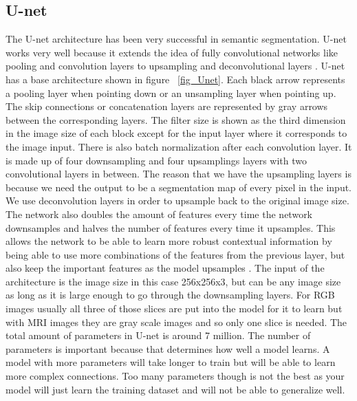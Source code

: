 \subsection{U-net}
%
The U-net architecture has been very successful in semantic segmentation. 
U-net works very well because it extends the idea of fully convolutional networks like pooling and convolution layers to upsampling and deconvolutional layers \cite{DBLP:journals/corr/RonnebergerFB15}.
U-net has a base architecture shown in figure ~\ref{fig_Unet}. 
Each black arrow represents a pooling layer when pointing down or an unsampling layer when pointing up. 
The skip connections or concatenation layers are represented by gray arrows between the corresponding layers. 
The filter size is shown as the third dimension in the image size of each block except for the input layer where it corresponds to the image input. 
There is also batch normalization after each convolution layer.
It is made up of four downsampling and four upsamplings layers with two convolutional layers in between. 
The reason that we have the upsampling layers is because we need the output to be a segmentation map of every pixel in the input.
We use deconvolution layers in order to upsample back to the original image size. 
The network also doubles the amount of features every time the network downsamples and halves the number of features every time it upsamples. 
This allows the network to be able to learn more robust contextual information by being able to use more combinations of the features from the previous layer, but also keep the important features as the model upsamples \cite{DBLP:journals/corr/RonnebergerFB15}. 
The input of the architecture is the image size in this case 256x256x3, but can be any image size as long as it is large enough to go through the downsampling layers.
For RGB images usually all three of those slices are put into the model for it to learn but with MRI images they are gray scale images and so only one slice is needed. 
The total amount of parameters in U-net is around 7 million. 
The number of parameters is important because that determines how well a model learns. 
A model with more parameters will take longer to train but will be able to learn more complex connections. 
Too many parameters though is not the best as your model will just learn the training dataset and will not be able to generalize well. 



